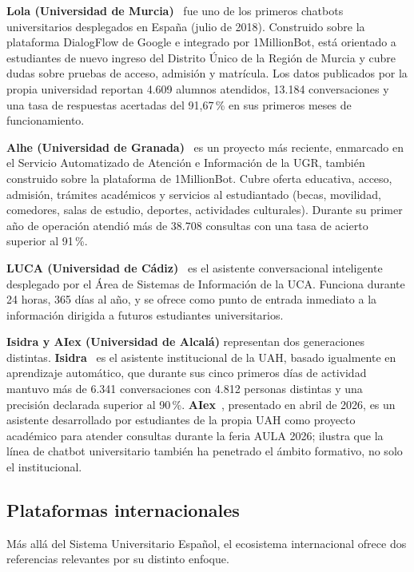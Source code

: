 \textbf{Lola (Universidad de Murcia)}~\cite{umuLola,millionbotLola} fue uno de los primeros chatbots universitarios desplegados en España (julio de 2018). Construido sobre la plataforma DialogFlow de Google e integrado por 1MillionBot, está orientado a estudiantes de nuevo ingreso del Distrito Único de la Región de Murcia y cubre dudas sobre pruebas de acceso, admisión y matrícula. Los datos publicados por la propia universidad reportan 4.609 alumnos atendidos, 13.184 conversaciones y una tasa de respuestas acertadas del 91,67\,\% en sus primeros meses de funcionamiento.

\textbf{Alhe (Universidad de Granada)}~\cite{ugrAlhe,millionbotUgr} es un proyecto más reciente, enmarcado en el Servicio Automatizado de Atención e Información de la UGR, también construido sobre la plataforma de 1MillionBot. Cubre oferta educativa, acceso, admisión, trámites académicos y servicios al estudiantado (becas, movilidad, comedores, salas de estudio, deportes, actividades culturales). Durante su primer año de operación atendió más de 38.708 consultas con una tasa de acierto superior al 91\,\%.

\textbf{LUCA (Universidad de Cádiz)}~\cite{ucaLuca} es el asistente conversacional inteligente desplegado por el Área de Sistemas de Información de la UCA. Funciona durante 24 horas, 365 días al año, y se ofrece como punto de entrada inmediato a la información dirigida a futuros estudiantes universitarios.

\textbf{Isidra y AIex (Universidad de Alcalá)} representan dos generaciones distintas. \textbf{Isidra}~\cite{uahIsidra} es el asistente institucional de la UAH, basado igualmente en aprendizaje automático, que durante sus cinco primeros días de actividad mantuvo más de 6.341 conversaciones con 4.812 personas distintas y una precisión declarada superior al 90\,\%. \textbf{AIex}~\cite{uahAiex}, presentado en abril de 2026, es un asistente desarrollado por estudiantes de la propia UAH como proyecto académico para atender consultas durante la feria AULA 2026; ilustra que la línea de chatbot universitario también ha penetrado el ámbito formativo, no solo el institucional.

\subsection{Plataformas internacionales}\label{subsec:soluciones-internacional}

Más allá del Sistema Universitario Español, el ecosistema internacional ofrece dos referencias relevantes por su distinto enfoque.


